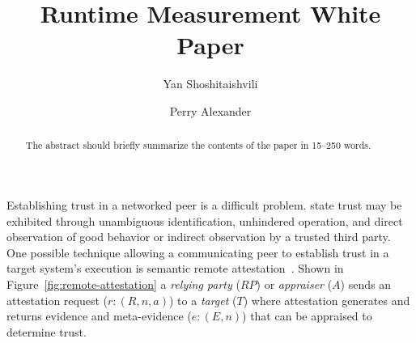 \documentclass[runningheads]{llncs}
\begin{document}
%
\title{Runtime Measurement White Paper}
%
%
\author{Yan Shoshitaishvili \and Perry Alexander}
%
%
%
\maketitle              %
%
\begin{abstract}
The abstract should briefly summarize the contents of the paper in
15--250 words.

\end{abstract}
%
%
%


Establishing trust in a networked peer is a difficult problem. \citet{Martin:08:The-ten-page-in} state trust may be exhibited through unambiguous identification, unhindered operation, and direct observation of good behavior or indirect observation by a trusted third party. One possible technique allowing a communicating peer to establish trust in a target system's execution is semantic remote attestation~\citep{Haldar:04:Semantic-Remote}. Shown in Figure~\ref{fig:remote-attestation} a \emph{relying party} ($RP$) or \emph{appraiser} ($A$) sends an attestation request ($r:(R,n,a)$) to a \emph{target} ($T$) where attestation generates and returns evidence
and meta-evidence ($e:(E,n)$) that can be appraised to determine
trust. 

\end{document}
